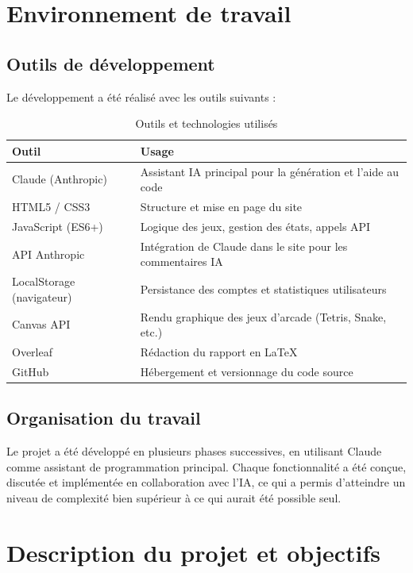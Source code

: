 \documentclass[a4paper, 12pt, twoside]{article}
\begin{document}
\section{Environnement de travail}

\subsection{Outils de développement}

Le développement a été réalisé avec les outils suivants :

\begin{table}[H]
\centering
\begin{tabular}{|p{4cm}|p{9cm}|}
\hline
\textbf{Outil} & \textbf{Usage} \\
\hline
Claude (Anthropic) & Assistant IA principal pour la génération et l'aide au code \\
\hline
HTML5 / CSS3 & Structure et mise en page du site \\
\hline
JavaScript (ES6+) & Logique des jeux, gestion des états, appels API \\
\hline
API Anthropic & Intégration de Claude dans le site pour les commentaires IA \\
\hline
LocalStorage (navigateur) & Persistance des comptes et statistiques utilisateurs \\
\hline
Canvas API & Rendu graphique des jeux d'arcade (Tetris, Snake, etc.) \\
\hline
Overleaf & Rédaction du rapport en \LaTeX \\
\hline
GitHub & Hébergement et versionnage du code source \\
\hline
\end{tabular}
\caption{Outils et technologies utilisés}
\label{tab:outils}
\end{table}

\subsection{Organisation du travail}

Le projet a été développé en plusieurs phases successives, en utilisant Claude comme assistant de programmation principal. Chaque fonctionnalité a été conçue, discutée et implémentée en collaboration avec l'IA, ce qui a permis d'atteindre un niveau de complexité bien supérieur à ce qui aurait été possible seul.

\newpage

\section{Description du projet et objectifs}
\end{document}
